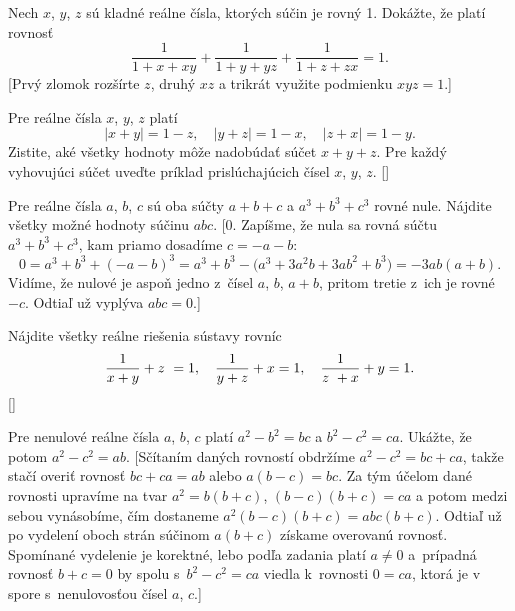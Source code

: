 {Nech $x$, $y$, $z$ sú kladné reálne čísla, ktorých súčin je
rovný 1. Dokážte, že platí rovnosť
$$
\frac{1}{1+x+xy}+\frac{1}{1+y+yz}+\frac{1}{1+z+zx}=1.
$$
[Prvý zlomok rozšírte $z$, druhý $xz$ a trikrát využite
podmienku $xyz=1$.]

Pre reálne čísla $x$, $y$, $z$ platí
$$
|x+y|=1-z,\quad|y+z|=1-x,\quad |z+x|=1-y.
$$
Zistite, aké všetky hodnoty môže nadobúdať súčet $x+y+z$. Pre
každý vyhovujúci súčet uveďte príklad prislúchajúcich čísel
$x$, $y$, $z$.
[]

Pre reálne čísla $a$, $b$, $c$ sú oba súčty $a+b+c$ a
$a^3+b^3+c^3$ rovné nule. Nájdite všetky možné hodnoty súčinu
$abc$.
[0. Zapíšme, že nula sa rovná súčtu $a^3+b^3+c^3$, kam priamo
dosadíme $c={-a}-b$:
$$
0=a^3+b^3+(-a-b)^3=a^3+b^3-\bigl(a^3+3a^2b+3ab^2+b^3\bigr)=-3ab(a+b).
$$
Vidíme, že nulové je aspoň jedno z~čísel $a$, $b$, $a+b$,
pritom tretie z~ich je rovné~${-c}$. Odtiaľ už vyplýva $abc=0$.]

Nájdite všetky reálne riešenia sústavy rovníc
$$
{1\over x + y}+ z~= 1,\quad
{1\over y + z}+ x = 1,\quad
{1\over z~+ x}+ y = 1.
$$
[]

Pre nenulové reálne čísla $a$, $b$, $c$ platí
$a^2-b^2=bc$ a $b^2-c^2=ca$. Ukážte, že potom $a^2-c^2=ab$.
[Sčítaním daných rovností obdržíme $a^2-c^2=bc+ca$, takže stačí
overiť rovnosť $bc+ca=ab$ alebo $a(b-c)=bc$. Za tým účelom dané rovnosti
upravíme na tvar $a^2=b(b+c)$, $(b-c)(b+c)=ca$ a potom medzi sebou vynásobíme,
čím dostaneme $a^2(b-c)(b+c)=abc(b+c)$. Odtiaľ už
po vydelení oboch strán súčinom $a(b+c)$ získame overovanú rovnosť.
Spomínané vydelenie je korektné, lebo podľa zadania platí $a\ne0$ a~prípadná rovnosť $b+c=0$ by spolu s~$b^2-c^2=ca$ viedla k~rovnosti
$0=ca$, ktorá je v spore s~nenulovosťou čísel $a$, $c$.]
}

